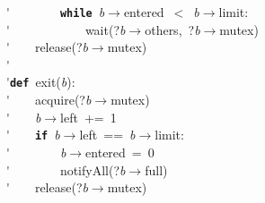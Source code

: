 \'\>~~~~~~~~\texttt{\textbf{while}}~\textit{b}$\rightarrow$entered~$<$~\textit{b}$\rightarrow$limit:\\

\'\>~~~~~~~~~~~~wait(?\textit{b}$\rightarrow$others,~?\textit{b}$\rightarrow$mutex)\\

\'\>~~~~release(?\textit{b}$\rightarrow$mutex)\\

\'\>\\

\'\>\texttt{\textbf{def}}~exit(\textit{b}):\\

\'\>~~~~acquire(?\textit{b}$\rightarrow$mutex)\\

\'\>~~~~\textit{b}$\rightarrow$left~+=~1\\

\'\>~~~~\texttt{\textbf{if}}~\textit{b}$\rightarrow$left~==~\textit{b}$\rightarrow$limit:\\

\'\>~~~~~~~~\textit{b}$\rightarrow$entered~=~0\\

\'\>~~~~~~~~notifyAll(?\textit{b}$\rightarrow$full)\\

\'\>~~~~release(?\textit{b}$\rightarrow$mutex)